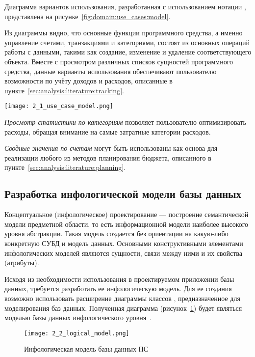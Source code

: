 Диаграмма вариантов использования, разработанная с использованием нотации \uml, представлена на рисунке~\ref{fig:domain:use_cases:model}.

Из диаграммы видно, что основные функции программного средства, а именно управление счетами, транзакциями и категориями, состоят из основных операций работы с данными, такими как создание, изменение и удаление соответствующего объекта.
Вместе с просмотром различных списков сущностей программного средства, данные варианты использования обеспечивают пользователю возможности по учёту доходов и расходов, описанные в пункте~\ref{sec:analysis:literature:tracking}.

\begin{sidewaysfigure}
    \centering
    \texttt{[image: 2\_1\_use\_case\_model.png]}
    \caption{Диаграмма вариантов использования ПС}
    \label{fig:domain:use_cases:model}
\end{sidewaysfigure}

\emph{Просмотр статистики по категориям} позволяет пользователю оптимизировать расходы, обращая внимание на самые затратные категории расходов.

\emph{Сводные значения по счетам} могут быть использованы как основа для реализации любого из методов планирования бюджета, описанного в пункте~\ref{sec:analysis:literature:planning}.

\subsection{Разработка инфологической модели базы данных}
\label{sec:domain:db}

Концептуальное (инфологическое) проектирование — построение семантической модели предметной области, то есть информационной модели наиболее высокого уровня абстракции.
Такая модель создается без ориентации на какую-либо конкретную СУБД и модель данных.
Основными конструктивными элементами инфологических моделей являются сущности, связи между ними и их свойства (атрибуты).

Исходя из необходимости использования в проектируемом приложении базы данных, требуется разработать ее инфологическую модель.
Для ее создания возможно использовать расширение диаграммы классов \uml, предназначенное для моделирования баз данных.
Полученная диаграмма (рисунок~\ref{fig:domain:db:model}) будет являться моделью базы данных инфологического уровня~\cite{kulikov_db_workbook}.

\begin{figure}[H]
    \centering
    \texttt{[image: 2\_2\_logical\_model.png]}
    \caption{Инфологическая модель базы данных ПС}
    \label{fig:domain:db:model}
\end{figure}


